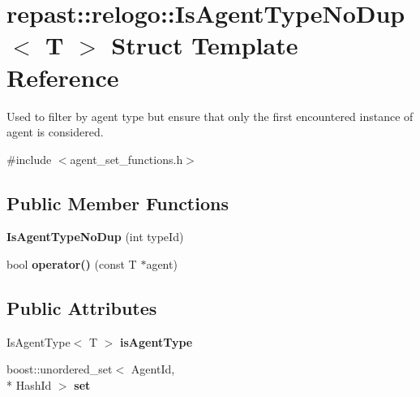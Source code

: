 \hypertarget{structrepast_1_1relogo_1_1_is_agent_type_no_dup}{\section{repast\-:\-:relogo\-:\-:Is\-Agent\-Type\-No\-Dup$<$ T $>$ Struct Template Reference}
\label{structrepast_1_1relogo_1_1_is_agent_type_no_dup}
}


Used to filter by agent type but ensure that only the first encountered instance of agent is considered.  




{\ttfamily \#include $<$agent\-\_\-set\-\_\-functions.\-h$>$}

\subsection*{Public Member Functions}
\begin{DoxyCompactItemize}
\item 
\hypertarget{structrepast_1_1relogo_1_1_is_agent_type_no_dup_ae0f58dd650ad972fb5ac0948f1b74444}{{\bfseries Is\-Agent\-Type\-No\-Dup} (int type\-Id)}\label{structrepast_1_1relogo_1_1_is_agent_type_no_dup_ae0f58dd650ad972fb5ac0948f1b74444}

\item 
\hypertarget{structrepast_1_1relogo_1_1_is_agent_type_no_dup_a08dd36ccec0bbd029b12a3436b2907d1}{bool {\bfseries operator()} (const T $\ast$agent)}\label{structrepast_1_1relogo_1_1_is_agent_type_no_dup_a08dd36ccec0bbd029b12a3436b2907d1}

\end{DoxyCompactItemize}
\subsection*{Public Attributes}
\begin{DoxyCompactItemize}
\item 
\hypertarget{structrepast_1_1relogo_1_1_is_agent_type_no_dup_a78e50c14dc80ced45d0b166145cf4347}{Is\-Agent\-Type$<$ T $>$ {\bfseries is\-Agent\-Type}}\label{structrepast_1_1relogo_1_1_is_agent_type_no_dup_a78e50c14dc80ced45d0b166145cf4347}

\item 
\hypertarget{structrepast_1_1relogo_1_1_is_agent_type_no_dup_ac2fbe23e714eb452a9db119a6d4db5f1}{boost\-::unordered\-\_\-set$<$ Agent\-Id, \\*
Hash\-Id $>$ {\bfseries set}}\label{structrepast_1_1relogo_1_1_is_agent_type_no_dup_ac2fbe23e714eb452a9db119a6d4db5f1}

\end{DoxyCompactItemize}


